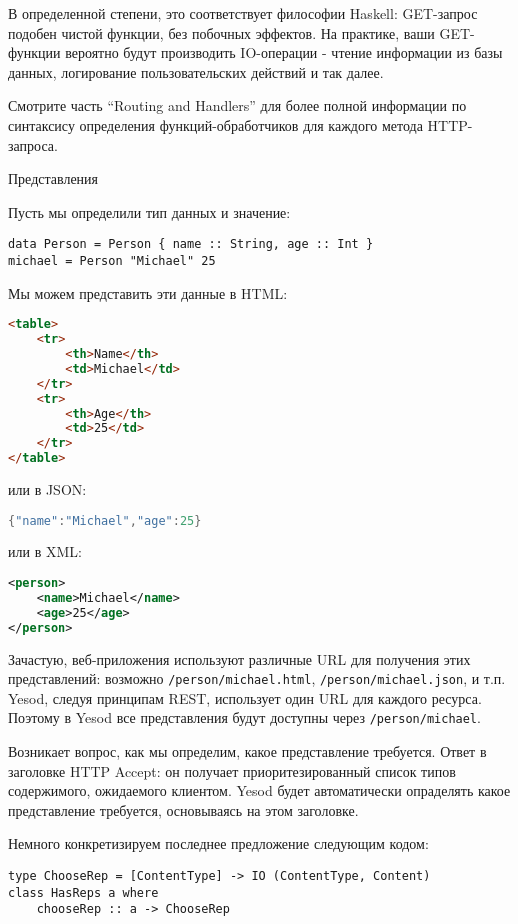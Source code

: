 В определенной степени, это соответствует философии Haskell: GET-запрос подобен чистой функции, без побочных эффектов. На практике, ваши GET-функции вероятно будут производить IO-операции - чтение информации из базы данных, логирование пользовательских действий и так далее.

Смотрите часть “Routing and Handlers” для более полной информации по синтаксису определения функций-обработчиков для каждого метода HTTP-запроса.

Представления

Пусть мы определили тип данных и значение:

\begin{lstlisting}
data Person = Person { name :: String, age :: Int }
michael = Person "Michael" 25
\end{lstlisting}

Мы можем представить эти данные в HTML:
\begin{lstlisting}[language=HTML]
 <table>
    <tr>
        <th>Name</th>
        <td>Michael</td>
    </tr>
    <tr>
        <th>Age</th>
        <td>25</td>
    </tr>
</table>
\end{lstlisting}

или в JSON:

\begin{lstlisting}[language=Java]
{"name":"Michael","age":25}
\end{lstlisting}

или в XML:
\begin{lstlisting}[language=XML]
<person>
    <name>Michael</name>
    <age>25</age>
</person>
\end{lstlisting}

Зачастую, веб-приложения используют различные URL для получения этих представлений: возможно \lstinline '/person/michael.html', \lstinline '/person/michael.json', и т.п. Yesod, следуя принципам REST, использует один URL для каждого ресурса. Поэтому в Yesod все представления будут доступны через \lstinline '/person/michael'.

Возникает вопрос, как мы определим, какое представление требуется. Ответ в заголовке HTTP Accept: он получает приоритезированный список типов содержимого, ожидаемого клиентом. Yesod будет автоматически опраделять какое представление требуется, основываясь на этом заголовке.

Немного конкретизируем последнее предложение следующим кодом:

\begin{lstlisting}
type ChooseRep = [ContentType] -> IO (ContentType, Content)
class HasReps a where
    chooseRep :: a -> ChooseRep
\end{lstlisting}

